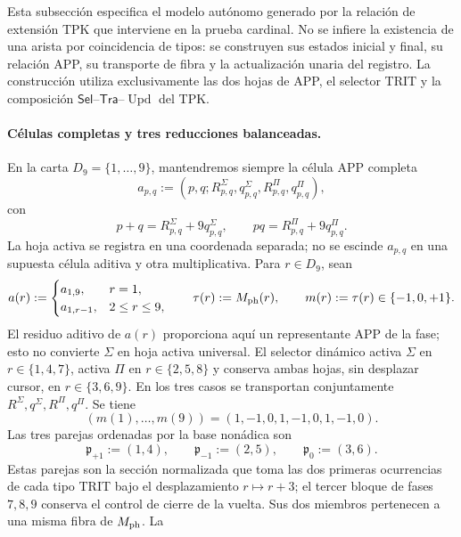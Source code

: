 Esta subsección especifica el modelo autónomo generado por la relación de
extensión TPK que interviene en la prueba cardinal. No se infiere la existencia de
una arista por coincidencia de tipos: se construyen sus estados inicial y final,
su relación APP, su transporte de fibra y la actualización unaria del registro.
La construcción utiliza exclusivamente las dos hojas de APP, el selector TRIT
y la composición \(\mathsf{Sel}\)--\(\mathsf{Tra}\)--\(\operatorname{Upd}\) del TPK.

\paragraph{Células completas y tres reducciones balanceadas.}
En la carta \(D_9=\{1,\ldots,9\}\), mantendremos siempre la célula APP
completa
\[
 a_{p,q}:=(p,q;R^\Sigma_{p,q},q^\Sigma_{p,q},
                 R^\Pi_{p,q},q^\Pi_{p,q}),
\]
con
\[
 p+q=R^\Sigma_{p,q}+9q^\Sigma_{p,q},\qquad
 pq=R^\Pi_{p,q}+9q^\Pi_{p,q}.
\]
La hoja activa se registra en una coordenada separada; no se escinde
\(a_{p,q}\) en una supuesta célula aditiva y otra multiplicativa. Para
\(r\in D_9\), sean
\begin{equation}
 a(r):=
 \begin{cases}
  a_{1,9},&r=1,\\
  a_{1,r-1},&2\le r\le9,
 \end{cases}
 \qquad
 \tau(r):=M_{\rm ph}(r),
 \qquad
 m(r):=\tau(r)\in\{-1,0,+1\}.
 \label{ix:eq:celula-completa-fase-ch}
\end{equation}
El residuo aditivo de \(a(r)\) proporciona aquí un representante APP de la
fase; esto no convierte \(\Sigma\) en hoja activa universal. El selector
dinámico activa \(\Sigma\) en \(r\in\{1,4,7\}\), activa \(\Pi\) en
\(r\in\{2,5,8\}\) y conserva ambas hojas, sin desplazar cursor, en
\(r\in\{3,6,9\}\). En los tres casos se transportan conjuntamente
\(R^\Sigma,q^\Sigma,R^\Pi,q^\Pi\). Se tiene
\[
 (m(1),\ldots,m(9))=(1,-1,0,1,-1,0,1,-1,0).
\]
Las tres parejas ordenadas por la base nonádica son
\begin{equation}
 \mathfrak p_{+1}:=(1,4),\qquad
 \mathfrak p_{-1}:=(2,5),\qquad
 \mathfrak p_{0}:=(3,6).
 \label{ix:eq:tres-pares-internos-ch}
\end{equation}
Estas parejas son la sección normalizada que toma las dos primeras
ocurrencias de cada tipo TRIT bajo el desplazamiento \(r\mapsto r+3\); el
tercer bloque de fases \(7,8,9\) conserva el control de cierre de la vuelta.
Sus dos miembros pertenecen a una misma fibra de \(M_{\rm ph}\). La
